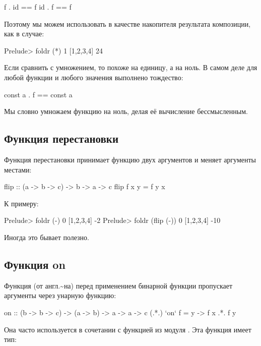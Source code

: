 \begin{code}
f  . id  ==  f
id . f   ==  f
\end{code}

Поэтому мы можем использовать  в качестве накопителя результата
композиции, как в случае:


\begin{code}
Prelude> foldr (*) 1 [1,2,3,4]
24
\end{code}

Если сравнить  с умножением, то  похоже на единицу, а
 на ноль. В самом деле для любой функции  и любого
значения  выполнено тождество:


\begin{code}
const a  .  f  == const a
\end{code}

Мы словно умножаем функцию на ноль, делая её вычисление бессмысленным.

\subsection{Функция перестановки}

Функция перестановки  принимает функцию двух аргументов и
меняет аргументы местами:


\begin{code}
flip  :: (a -> b -> c) -> b -> a -> c
flip f x y = f y x
\end{code}

К примеру:


\begin{code}
Prelude> foldr (-) 0 [1,2,3,4]
-2
Prelude> foldr (flip (-)) 0 [1,2,3,4]
-10
\end{code}

Иногда это бывает полезно.

\subsection{Функция on}

Функция  (от англ.\textasciitilde{}на) перед применением бинарной
функции пропускает аргументы через унарную функцию:


\begin{code}
on :: (b -> b -> c) -> (a -> b) -> a -> a -> c
(.*.) `on` f = \x y -> f x .*. f y
\end{code}

Она часто используется в сочетании с функцией  из модуля
. Эта функция имеет тип:


